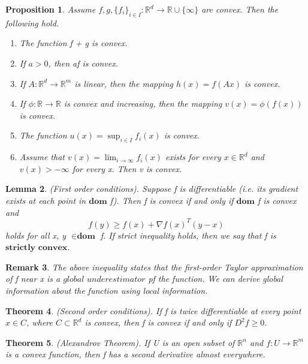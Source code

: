 \documentclass[twoside]{article}
\newcounter{lecnum}
\newtheorem{theorem}{Theorem}[lecnum]
\newtheorem{lemma}[theorem]{Lemma}
\newtheorem{proposition}[theorem]{Proposition}
\newtheorem{remark}[theorem]{Remark}
\begin{document}
\begin{proposition}Assume $f,g,\{f_i\}_{i \in I}: \mathbb{R}^d \rightarrow \mathbb{R} \cup \{\infty\}$ are convex. Then the following hold.
\begin{enumerate}
    \item The function f + g is convex.
    \item If $a > 0$, then af is convex.
    \item If $A: \mathbb{R}^d \rightarrow \mathbb{R}^m$ is linear, then the mapping $h(x) = f(Ax)$ is convex.
    \item If $\phi: \mathbb{R} \rightarrow \mathbb{R}$ is convex and increasing, then the mapping $v(x) = \phi(f(x))$ is convex.
    \item The function $u(x) = \sup_{i \in I}f_i(x)$ is convex.
    \item Assume that $v(x) = \lim_{i \rightarrow \infty}f_i(x)$ exists for every $x \in \mathbb{R}^d$ and $v(x) > -\infty$ for every x. Then v is convex.
\end{enumerate}
\end{proposition}


\begin{lemma}(First order conditions). Suppose f is differentiable (i.e. its gradient exists at each point in $\textbf{dom}$ f). Then f is convex if and only if $\textbf{dom}$ f is convex and 
$$
f(y) \geq f(x) + \nabla f(x)^T(y-x)
$$
holds for all x, y $\in \textbf{dom}$ f. If strict inequality holds, then we say that f is $\textbf{strictly convex}$.
\end{lemma}

\begin{remark}The above inequality states that the first-order Taylor approximation of f near x is a $\textit{global underestimator}$ pf the function. We can derive global information about the function using local information.
\end{remark}

\begin{theorem}(Second order conditions). If f is twice differentiable at every point $x \in C$, where $C \subset \mathbb{R}^d$ is convex, then f is convex if and only if $D^2f \geq 0$.
\end{theorem}
\begin{theorem}(Alexandrov Theorem). If U is an open subset of $\mathbb{R}^n$ and $f: U \rightarrow \mathbb{R}^m$ is a convex function, then f has a second derivative almost everywhere.
\end{theorem}
\end{document}
